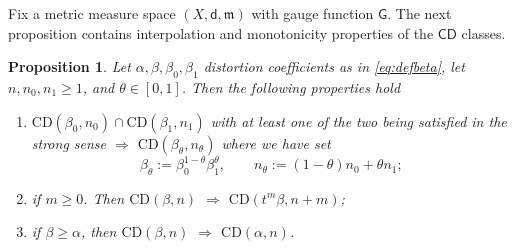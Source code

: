 \documentclass[11pt,a4paper]{article}
\theoremstyle{plain}
\newtheorem{proposition}[theorem]{Proposition}
\theoremstyle{definition}
\theoremstyle{remark}
\numberwithin{equation}{section}
\newcommand{\CD}{\mathsf{CD}}
\newcommand{\mm}{\mathfrak m}
\newcommand{\sfd}{\mathsf d}
\newcommand{\sfG}{\mathsf G}
\begin{document}
Fix a metric measure space $(X,\sfd,\mm)$ with gauge function $\sfG$. The next proposition contains interpolation and monotonicity properties of the $\CD$ classes.

\begin{proposition}\label{prop:hierarchy}
Let $\alpha,\beta,\beta_0,\beta_1$ distortion coefficients as in \eqref{eq:defbeta}, let $n,n_0,n_1 \geq 1$, and $\theta \in [0,1]$. Then the following properties hold
\begin{enumerate}[label = (\roman*)]
\item \label{i:hierarchy1} $\mathrm{CD}(\beta_{0},n_{0})\cap \mathrm{CD}(\beta_{1},n_{1})$ with at least one of the two being satisfied in the strong sense $\Longrightarrow$ $\mathrm{CD}(\beta_{\theta},n_{\theta})$ where we have set
\[
\beta_{\theta}:=\beta_{0}^{1-\theta}\beta_{1}^{\theta},\qquad n_{\theta}:=(1-\theta)n_{0}+\theta n_{1};
\]
\item \label{i:hierarchy2} if $m\geq 0$. Then $\mathrm{CD}(\beta,n)$ $\Longrightarrow$ $\mathrm{CD}(t^{m} \beta,n+m)$;
\item \label{i:hierarchy3} if $\beta\geq \alpha$, then $\mathrm{CD}(\beta,n)$ $\Longrightarrow$ $\mathrm{CD}(\alpha,n)$.
\end{enumerate}
\end{proposition}
\end{document}
